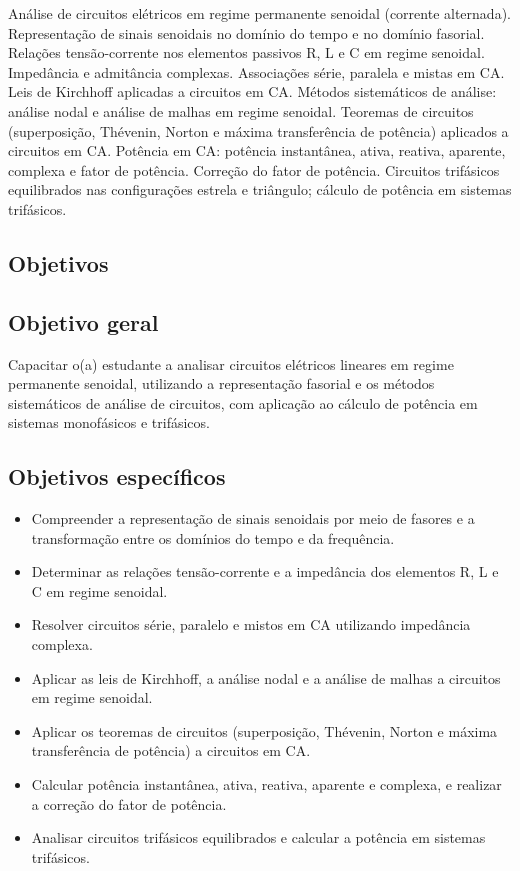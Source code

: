 \documentclass[oneside,a4paper,12pt]{article}
\begin{document}
Análise de circuitos elétricos em regime permanente senoidal (corrente alternada). Representação de sinais senoidais no domínio do tempo e no domínio fasorial. Relações tensão-corrente nos elementos passivos R, L e C em regime senoidal. Impedância e admitância complexas. Associações série, paralela e mistas em CA. Leis de Kirchhoff aplicadas a circuitos em CA. Métodos sistemáticos de análise: análise nodal e análise de malhas em regime senoidal. Teoremas de circuitos (superposição, Thévenin, Norton e máxima transferência de potência) aplicados a circuitos em CA. Potência em CA: potência instantânea, ativa, reativa, aparente, complexa e fator de potência. Correção do fator de potência. Circuitos trifásicos equilibrados nas configurações estrela e triângulo; cálculo de potência em sistemas trifásicos.

  \begin{snugshade}
  \section{Objetivos}
\end{snugshade}

\subsection*{Objetivo geral}

Capacitar o(a) estudante a analisar circuitos elétricos lineares em regime permanente senoidal, utilizando a representação fasorial e os métodos sistemáticos de análise de circuitos, com aplicação ao cálculo de potência em sistemas monofásicos e trifásicos.

\subsection*{Objetivos específicos}

\begin{itemize}
    \item Compreender a representação de sinais senoidais por meio de fasores e a transformação entre os domínios do tempo e da frequência.
    \item Determinar as relações tensão-corrente e a impedância dos elementos R, L e C em regime senoidal.
    \item Resolver circuitos série, paralelo e mistos em CA utilizando impedância complexa.
    \item Aplicar as leis de Kirchhoff, a análise nodal e a análise de malhas a circuitos em regime senoidal.
    \item Aplicar os teoremas de circuitos (superposição, Thévenin, Norton e máxima transferência de potência) a circuitos em CA.
    \item Calcular potência instantânea, ativa, reativa, aparente e complexa, e realizar a correção do fator de potência.
    \item Analisar circuitos trifásicos equilibrados e calcular a potência em sistemas trifásicos.
\end{itemize}
\end{document}
